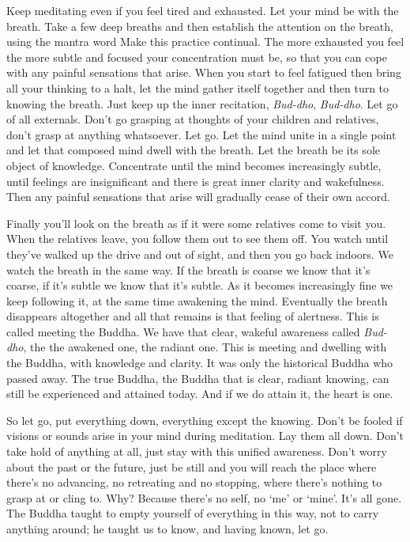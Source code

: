 Keep meditating even if you feel tired and exhausted. Let your mind be with the breath. Take a few deep breaths and then establish the attention on the breath, using the mantra word  Make this practice continual. The more exhausted you feel the more subtle and focused your concentration must be, so that you can cope with any painful sensations that arise. When you start to feel fatigued then bring all your thinking to a halt, let the mind gather itself together and then turn to knowing the breath. Just keep up the inner recitation, \textit{Bud-dho}, \textit{Bud-dho}. Let go of all externals. Don't go grasping at thoughts of your children and relatives, don't grasp at anything whatsoever. Let go. Let the mind unite in a single point and let that composed mind dwell with the breath. Let the breath be its sole object of knowledge. Concentrate until the mind becomes increasingly subtle, until feelings are insignificant and there is great inner clarity and wakefulness. Then any painful sensations that arise will gradually cease of their own accord.

Finally you'll look on the breath as if it were some relatives come to visit you. When the relatives leave, you follow them out to see them off. You watch until they've walked up the drive and out of sight, and then you go back indoors. We watch the breath in the same way. If the breath is coarse we know that it's coarse, if it's subtle we know that it's subtle. As it becomes increasingly fine we keep following it, at the same time awakening the mind. Eventually the breath disappears altogether and all that remains is that feeling of alertness. This is called meeting the Buddha. We have that clear, wakeful awareness called \textit{Bud-dho}, the  the awakened one, the radiant one. This is meeting and dwelling with the Buddha, with knowledge and clarity. It was only the historical Buddha who passed away. The true Buddha, the Buddha that is clear, radiant knowing, can still be experienced and attained today. And if we do attain it, the heart is one.

So let go, put everything down, everything except the knowing. Don't be fooled if visions or sounds arise in your mind during meditation. Lay them all down. Don't take hold of anything at all, just stay with this unified awareness. Don't worry about the past or the future, just be still and you will reach the place where there's no advancing, no retreating and no stopping, where there's nothing to grasp at or cling to. Why? Because there's no self, no `me' or `mine'. It's all gone. The Buddha taught to empty yourself of everything in this way, not to carry anything around; he taught us to know, and having known, let go.


